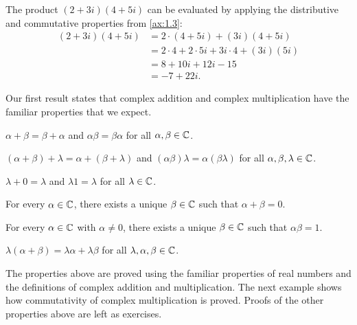 \begin{example}\label{ax:1.2}
The product $(2+3i)(4+5i)$ can be evaluated by applying the distributive and
commutative properties from \ref{ax:1.3}:
\begin{align*}
(2+3i)(4+5i) &= 2\cdot(4+5i) + (3i)(4+5i)\\
             &= 2\cdot4 + 2\cdot5i + 3i\cdot4 + (3i)(5i)\\
             &= 8 + 10i + 12i - 15\\
             &= -7 + 22i.
\end{align*}
\end{example}

Our first result states that complex addition and complex multiplication have
the familiar properties that we expect.

\begin{result}\label{ax:1.3}\leavevmode
\begin{axprops}
\item[commutativity] $\alpha+\beta=\beta+\alpha$ and $\alpha\beta=\beta\alpha$
  for all $\alpha,\beta\in\mathbb{C}$.
\item[associativity] $(\alpha+\beta)+\lambda=\alpha+(\beta+\lambda)$ and
  $(\alpha\beta)\lambda=\alpha(\beta\lambda)$ for all $\alpha,\beta,\lambda\in\mathbb{C}$.
\item[identities] $\lambda+0=\lambda$ and $\lambda1=\lambda$ for all $\lambda\in\mathbb{C}$.
\item[additive inverse] For every $\alpha\in\mathbb{C}$, there exists a unique
  $\beta\in\mathbb{C}$ such that $\alpha+\beta=0$.
\item[multiplicative inverse] For every $\alpha\in\mathbb{C}$ with $\alpha\ne0$, there
  exists a unique $\beta\in\mathbb{C}$ such that $\alpha\beta=1$.
\item[distributive property] $\lambda(\alpha+\beta)=\lambda\alpha+\lambda\beta$
  for all $\lambda,\alpha,\beta\in\mathbb{C}$.
\end{axprops}
\end{result}

The properties above are proved using the familiar properties of real numbers
and the definitions of complex addition and multiplication. The next example
shows how commutativity of complex multiplication is proved. Proofs of the
other properties above are left as exercises.

